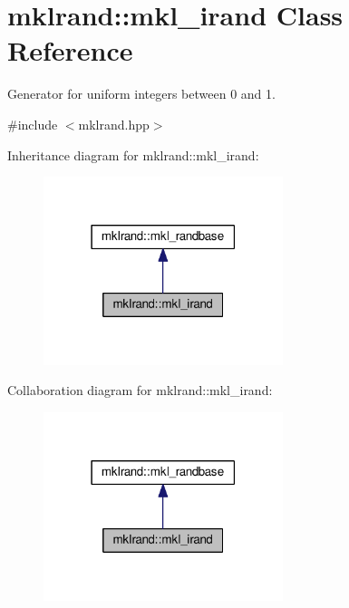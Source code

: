 \hypertarget{classmklrand_1_1mkl__irand}{}\section{mklrand\+:\+:mkl\+\_\+irand Class Reference}
\label{classmklrand_1_1mkl__irand}


Generator for uniform integers between 0 and 1.  




{\ttfamily \#include $<$mklrand.\+hpp$>$}



Inheritance diagram for mklrand\+:\+:mkl\+\_\+irand\+:
\nopagebreak
\begin{figure}[H]
\begin{center}
\leavevmode
\includegraphics[width=198pt]{d0/d1e/classmklrand_1_1mkl__irand__inherit__graph}
\end{center}
\end{figure}


Collaboration diagram for mklrand\+:\+:mkl\+\_\+irand\+:
\nopagebreak
\begin{figure}[H]
\begin{center}
\leavevmode
\includegraphics[width=198pt]{df/d22/classmklrand_1_1mkl__irand__coll__graph}
\end{center}
\end{figure}
